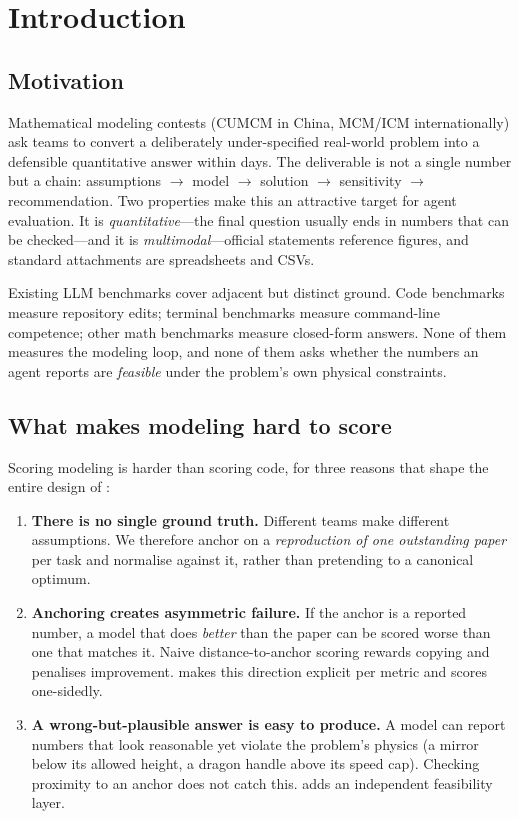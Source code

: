 \section{Introduction}

\subsection{Motivation}
Mathematical modeling contests (CUMCM in China, MCM/ICM internationally) ask teams to convert a deliberately under-specified real-world problem into a defensible quantitative answer within days. The deliverable is not a single number but a chain: assumptions $\rightarrow$ model $\rightarrow$ solution $\rightarrow$ sensitivity $\rightarrow$ recommendation. Two properties make this an attractive target for agent evaluation. It is \emph{quantitative}---the final question usually ends in numbers that can be checked---and it is \emph{multimodal}---official statements reference figures, and standard attachments are spreadsheets and CSVs.

Existing LLM benchmarks cover adjacent but distinct ground. Code benchmarks measure repository edits; terminal benchmarks measure command-line competence; other math benchmarks measure closed-form answers. None of them measures the modeling loop, and none of them asks whether the numbers an agent reports are \emph{feasible} under the problem's own physical constraints.

\subsection{What makes modeling hard to score}
Scoring modeling is harder than scoring code, for three reasons that shape the entire design of \bench{}:
\begin{enumerate}[leftmargin=1.4em,itemsep=2pt]
\item \textbf{There is no single ground truth.} Different teams make different assumptions. We therefore anchor on a \emph{reproduction of one outstanding paper} per task and normalise against it, rather than pretending to a canonical optimum.
\item \textbf{Anchoring creates asymmetric failure.} If the anchor is a reported number, a model that does \emph{better} than the paper can be scored worse than one that matches it. Naive distance-to-anchor scoring rewards copying and penalises improvement. \bench{} makes this direction explicit per metric and scores one-sidedly.
\item \textbf{A wrong-but-plausible answer is easy to produce.} A model can report numbers that look reasonable yet violate the problem's physics (a mirror below its allowed height, a dragon handle above its speed cap). Checking proximity to an anchor does not catch this. \bench{} adds an independent feasibility layer.
\end{enumerate}

